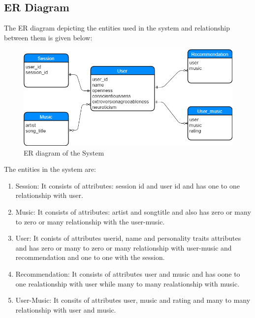 \subsection{ER Diagram}
The  ER diagram depicting the entities used in the system and relationship between them is given below:
\begin{figure}[!ht]
\centering
\includegraphics[width = 16 cm]{fig/erdiagram.png}
\caption{ER diagram of the System}
\label{fig:er}
\end{figure}
The entities in the system are:
\begin{enumerate}
	\item Session: It consists of attributes: session id and user id and has one to one relationship with user.
	\item Music: It consists of attributes: artist and songtitle and also has zero or many to zero or many relationship with the user-music. 
	\item User: It conists of attributes userid, name and personality traits attributes and has zero or many to zero or many relationship with user-music and recommendation and one to one with the session. 
	\item Recommendation: It consists of attributes user and music and has oone to one realationship with user while many to many realationship with music.
	
	\item User-Music: It consits of attributes user, music and rating and many to many relationship with user and music. 
\end{enumerate}
\newpage
